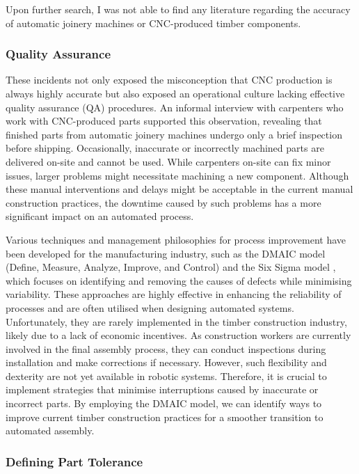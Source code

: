 Upon further search, I was not able to find any literature regarding the accuracy of automatic joinery machines or CNC-produced timber components.

\subsubsection{Quality Assurance}

These incidents not only exposed the misconception that CNC production is always highly accurate but also exposed an operational culture lacking effective quality assurance (QA) procedures. An informal interview with carpenters who work with CNC-produced parts supported this observation, revealing that finished parts from automatic joinery machines undergo only a brief inspection before shipping. Occasionally, inaccurate or incorrectly machined parts are delivered on-site and cannot be used. While carpenters on-site can fix minor issues, larger problems might necessitate machining a new component. Although these manual interventions and delays might be acceptable in the current manual construction practices, the downtime caused by such problems has a more significant impact on an automated process.

Various techniques and management philosophies for process improvement have been developed for the manufacturing industry, such as the DMAIC model (Define, Measure, Analyze, Improve, and Control) and the Six Sigma model \parencite{tsungSixSigma2023}, which focuses on identifying and removing the causes of defects while minimising variability. These approaches are highly effective in enhancing the reliability of processes and are often utilised when designing automated systems. Unfortunately, they are rarely implemented in the timber construction industry, likely due to a lack of economic incentives. As construction workers are currently involved in the final assembly process, they can conduct inspections during installation and make corrections if necessary. However, such flexibility and dexterity are not yet available in robotic systems. Therefore, it is crucial to implement strategies that minimise interruptions caused by inaccurate or incorrect parts. By employing the DMAIC model, we can identify ways to improve current timber construction practices for a smoother transition to automated assembly.

\subsubsection{Defining Part Tolerance}

